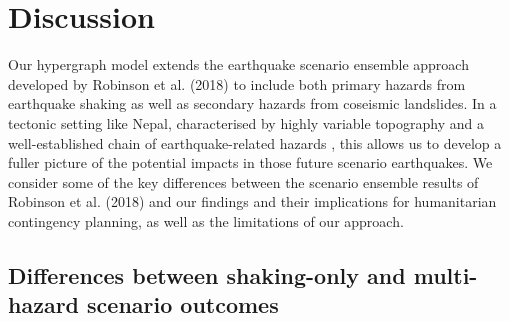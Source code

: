 \documentclass[preprint,12pt,authoryear]{elsarticle}
\begin{document}
\section{Discussion}

Our hypergraph model extends the earthquake scenario ensemble approach developed by Robinson et al. (2018) to include both primary hazards from earthquake shaking as well as secondary hazards from coseismic landslides. In a tectonic setting like Nepal, characterised by highly variable topography and a well-established chain of earthquake-related hazards \citep{Kincey2021}, this allows us to develop a fuller picture of the potential impacts in those future scenario earthquakes. We consider some of the key differences between the scenario ensemble results of Robinson et al. (2018) and our findings and their implications for humanitarian contingency planning, as well as the limitations of our approach.

\subsection{Differences between shaking-only and multi-hazard scenario outcomes}
\end{document}
